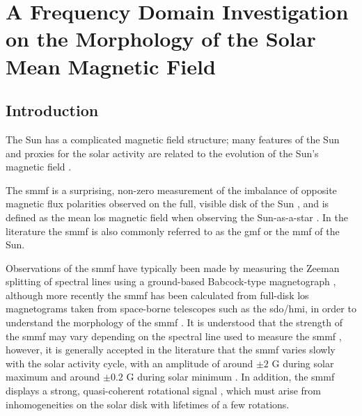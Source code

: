 \chapter{A Frequency Domain Investigation on the Morphology of the Solar Mean Magnetic Field}\label{chap:SMMF}

\section{Introduction}\label{sec:SMMF_intro}

The Sun has a complicated magnetic field structure; many features of the Sun and proxies for the solar activity are related to the evolution of the Sun's magnetic field \citep{wu_solar_2018}.

The \gls{smmf} is a surprising, non-zero measurement of the imbalance of opposite magnetic flux polarities observed on the full, visible disk of the Sun \citep{svalgaard_suns_1975}, and is defined as the mean \gls{los} magnetic field when observing the Sun-as-a-star \citep{scherrer_mean_1977, scherrer_mean_1977-1, garcia_integrated_1999}. In the literature the \gls{smmf} is also commonly referred to as the \gls{gmf} \citep{severny_time_1971} or the \gls{mmf} \citep{kotov_mean_2008} of the Sun.

Observations of the \gls{smmf} have typically been made by measuring the Zeeman splitting of spectral lines using a ground-based Babcock-type magnetograph \citep{scherrer_mean_1977}, although more recently the \gls{smmf} has been calculated from full-disk \gls{los} magnetograms taken from space-borne telescopes such as the \gls{sdo/hmi}, in order to understand the morphology of the \gls{smmf} \citep{kutsenko_contribution_2017, bose_variability_2018}. It is understood that the strength of the \gls{smmf} may vary depending on the spectral line used to measure the \gls{smmf} \citep{kotov_mean_2008, kotov_enigmas_2012}, however, it is generally accepted in the literature that the \gls{smmf} varies slowly with the solar activity cycle, with an amplitude of around $\pm 2$ G during solar maximum and around $\pm 0.2$ G during solar minimum \citep{plachinda_general_2011}. In addition, the \gls{smmf} displays a strong, quasi-coherent rotational signal \citep{chaplin_studies_2003, xie_temporal_2017}, which must arise from inhomogeneities on the solar disk with lifetimes of a few rotations.

